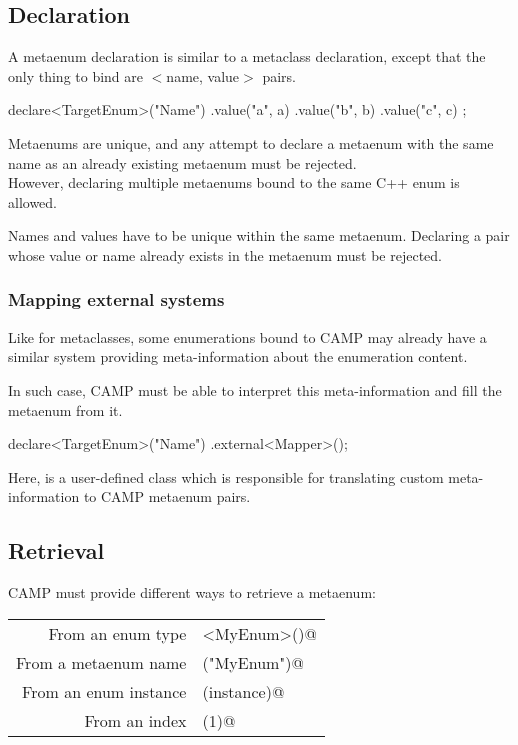 \documentclass[a4paper, twoside]{report}
\begin{document}
\subsection{Declaration}

	A metaenum declaration is similar to a metaclass declaration, except that the only thing to bind are
	$<$name, value$>$ pairs.
	
\begin{cppcode}
declare<TargetEnum>("Name")
  .value("a", a)
  .value("b", b)
  .value("c", c)
  ;
\end{cppcode}
	
	\ibwarning
	{
			Metaenums are unique, and any attempt to declare a metaenum with the same name
			as an already existing metaenum must be rejected. \\
			However, declaring multiple metaenums bound to the same C++ enum is allowed.
	}
	
	\ibwarning
	{
		Names and values have to be unique within the same metaenum. Declaring a pair whose
		value or name already exists in the metaenum must be rejected.
	}

\subsubsection{Mapping external systems}

	Like for metaclasses, some enumerations bound to CAMP may already have a similar system
	providing meta-information about the enumeration content.

	In such case, CAMP must be able to interpret this meta-information and fill the metaenum
	from it.
	
\begin{cppcode}
declare<TargetEnum>("Name")
  .external<Mapper>();
\end{cppcode}
	
	Here, \verb@Mapper@ is a user-defined class which is responsible for
	translating custom meta-information to CAMP metaenum pairs.

\subsection{Retrieval}

	CAMP must provide different ways to retrieve a metaenum:

	\begin{tabular}{r|l}
		From an enum type			& \verb@enumByType<MyEnum>()@   \\
		From a metaenum name  & \verb@enumByName("MyEnum")@   \\
		From an enum instance &	\verb@enumByObject(instance)@ \\
		From an index				  &	\verb@enumByIndex(1)@ 			  \\
	\end{tabular}
	
\end{document}
